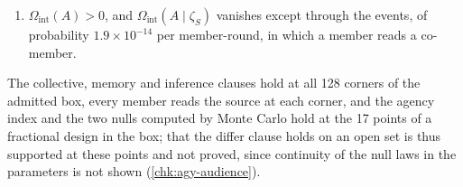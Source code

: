 \begin{observation}
\begin{enumerate}
\item[(f)] $\Omega_{\mathrm{int}}(A)>0$, and $\Omega_{\mathrm{int}}(A\mid\zeta_S)$ vanishes except through the events, of probability $1.9\times10^{-14}$ per member-round, in which a member reads a co-member.
\end{enumerate}
The collective, memory and inference clauses hold at all 128 corners of the admitted box, every member reads the source at each corner, and the agency index and the two nulls computed by Monte Carlo hold at the 17 points of a fractional design in the box; that the differ clause holds on an open set is thus supported at these points and not proved, since continuity of the null laws in the parameters is not shown (\cref{chk:agy-audience}).
\end{observation}

